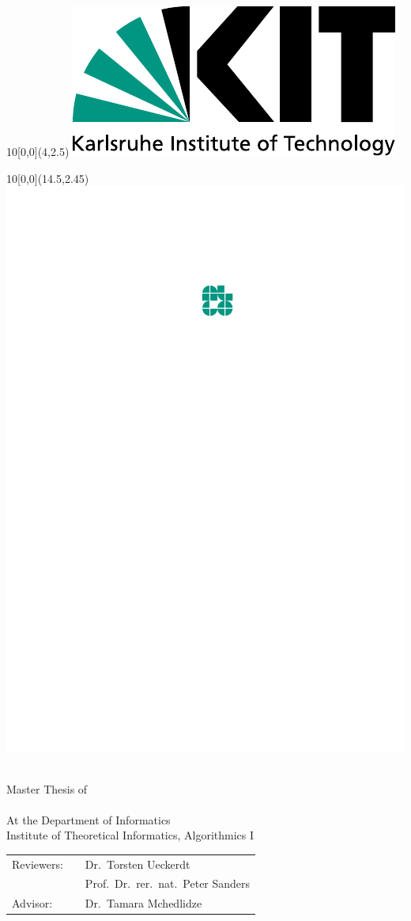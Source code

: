 \makeatletter
\begin{titlepage}


\begin{textblock}{10}[0,0](4,2.5)
\includegraphics[width=.3\textwidth]{Resources/Logos/KIT.pdf}
\end{textblock}

\begin{textblock}{10}[0,0](14.5,2.45)
\includegraphics[width=.15\textwidth]{Resources/Logos/Algo.pdf}
\end{textblock}


\vspace*{3.75cm}

\begin{center}
  \Huge{\@title}
  \vspace*{2.25cm}\\
  \Large{Master Thesis of}\\
  \vspace*{1cm}
  \huge{\@author}\\
  \vspace*{1cm}
  \Large{At the Department of Informatics}\\
  \Large{Institute of Theoretical Informatics, Algorithmics I}\\
\end{center}

\vspace*{1cm}

\begin{center}
\begin{Large}
\begin{tabular}[ht]{l c l}
  Reviewers: & \hfill & Dr.~Torsten Ueckerdt\\
  & \hfill & Prof.~Dr.~rer.~nat.~Peter Sanders\\
  Advisor: & \hfill & Dr.~Tamara Mchedlidze
\end{tabular}
\end{Large}
\end{center}


\end{titlepage}
